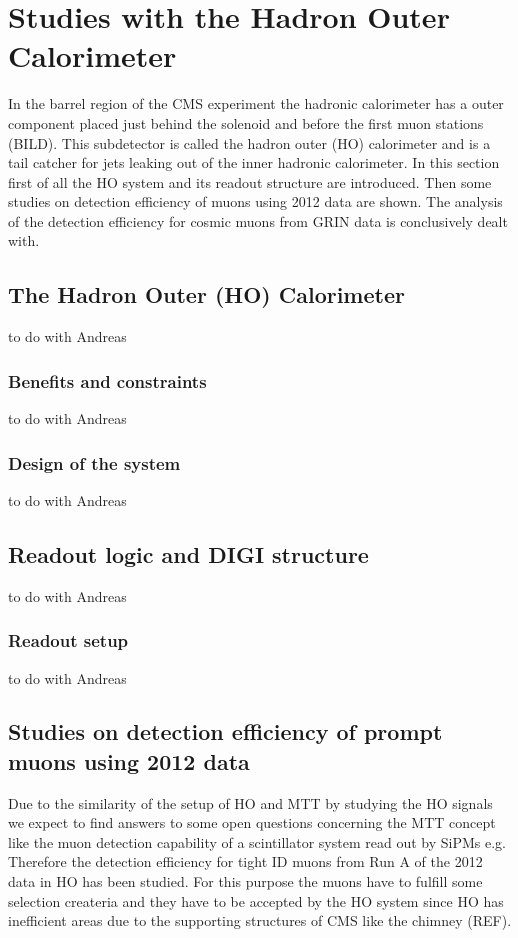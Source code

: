 \section{Studies with the Hadron Outer Calorimeter}
In the barrel region of the CMS experiment the hadronic calorimeter has a outer component placed just behind the solenoid and before the first muon stations (BILD). 
This subdetector is called the hadron outer (HO) calorimeter and is a tail catcher for jets leaking out of the inner hadronic calorimeter.
In this section first of all the HO system and its readout structure are introduced.
Then some studies on detection efficiency of muons using 2012 data are shown. The analysis of the detection efficiency for cosmic muons from GRIN data is conclusively dealt with.
	\subsection{The Hadron Outer (HO) Calorimeter}
		to do with Andreas
  		\subsubsection{Benefits and constraints}
			to do with Andreas
  		\subsubsection{Design of the system}
			to do with Andreas
	\subsection{Readout logic and DIGI structure}
		to do with Andreas
  		\subsubsection{Readout setup}
			to do with Andreas
	\subsection{Studies on detection efficiency of prompt muons using 2012 data}
		Due to the similarity of the setup of HO and MTT by studying the HO signals we expect to find answers to some open questions concerning the MTT concept like the muon detection capability of a
		scintillator system  read out by SiPMs e.g. Therefore the detection efficiency for tight ID muons from  Run A of the 2012 data in HO has been studied.
		For this purpose the muons have to fulfill some selection createria and they have to be accepted by the HO system since HO has inefficient areas due to the supporting structures of CMS like the
		chimney (REF).
